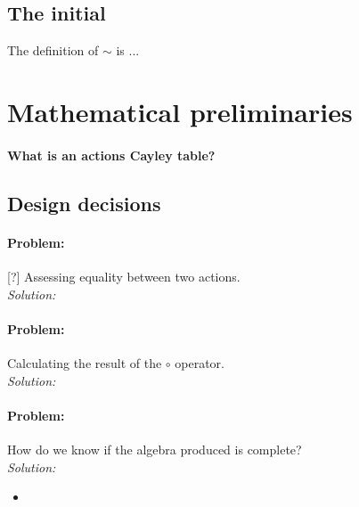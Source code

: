 \subsection{The initial}


The definition of $\sim$ is ...





\section{Mathematical preliminaries}


\paragraph{What is an actions Cayley table?}




\subsection{Design decisions}

\paragraph{Problem:}
[?] Assessing equality between two actions.
\\\textit{Solution:}


\paragraph{Problem:}
Calculating the result of the $\circ$ operator.
\\\textit{Solution:}




\paragraph{Problem:}
How do we know if the algebra produced is complete?
\\\textit{Solution:}
\begin{itemize}
	\item
\end{itemize}


